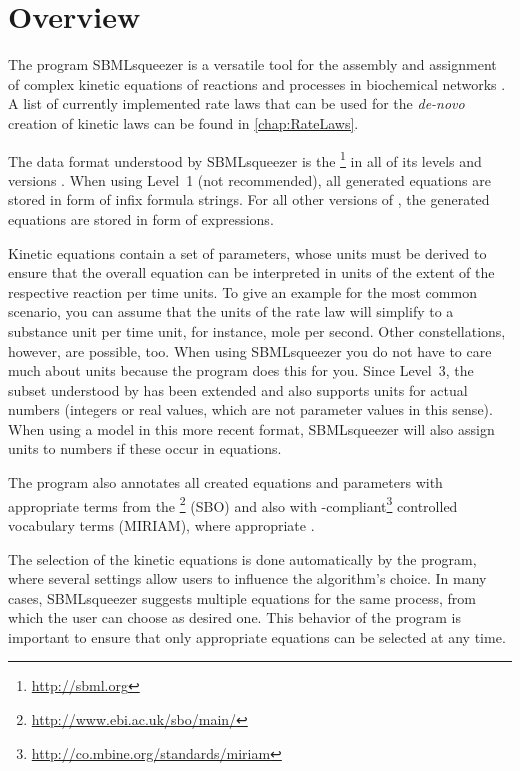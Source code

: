 \chapter{Overview}

The program SBMLsqueezer is a versatile tool for the assembly and assignment of
complex kinetic equations of reactions and processes in biochemical networks
\citep{Draeger2008, Draeger2010a, Draeger2011a}.
A list of currently implemented rate laws that can be used for the \emph{de-novo}
creation of kinetic laws can be found in \vref{chap:RateLaws}.

The data format understood by SBMLsqueezer is the
\SBML\footnote{\url{http://sbml.org}} in all of its levels and
versions \citep{Hucka2001, Hucka2003, M.Hucka03012003, Hucka2007, Hucka2008,
Hucka2010a, Finney2003, Finney2006}.
When using \SBML Level~1 (not recommended), all generated equations are stored
in form of infix formula strings. For all other versions of \SBML, the generated
equations are stored in form of \MathML \citep{Buswell1999} expressions.

Kinetic equations contain a set of parameters, whose units must be derived to
ensure that the overall equation can be interpreted in units of the extent of the
respective reaction per time units.
To give an example for the most common scenario, you can assume that the units
of the rate law will simplify to a substance unit per time unit, for instance,
mole per second.
Other constellations, however, are possible, too.
When using SBMLsqueezer you do not have to care much about units because the
program does this for you.
Since Level~3, the \MathML subset understood by \SBML has been extended and also supports
units for actual numbers (integers or real values, which are not parameter values in this sense).
When using a model in this more recent format, SBMLsqueezer will also assign units
to numbers if these occur in equations.

The program also annotates all created equations and parameters with appropriate
terms from the \SBO\footnote{\url{http://www.ebi.ac.uk/sbo/main/}} (\acl{SBO}) and also
with \MIRIAM-compliant\footnote{\url{http://co.mbine.org/standards/miriam}}
controlled vocabulary terms (\acl{MIRIAM}), where appropriate \citep{Le2005, Novere2006b, Laible2007, Courtot2011}.

The selection of the kinetic equations is done automatically by the program,
where several settings allow users to influence the algorithm's choice.
In many cases, SBMLsqueezer suggests multiple equations for the same process,
from which the user can choose as desired one.
This behavior of the program is important to ensure that only appropriate
equations can be selected at any time.

